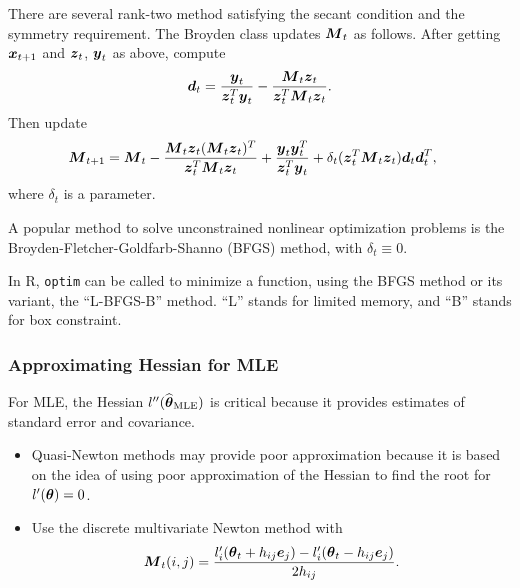   \begin{frame}
  There are several rank-two method satisfying the secant condition
  and the symmetry requirement.  The Broyden class updates $\boldsymbol{M}_t$
  as follows.  After getting $\boldsymbol{x}_{t+1}$ and $\boldsymbol{z}_t$, $\boldsymbol{y}_t$ as
  above, compute
  \begin{align*}
    \boldsymbol{d}_t = \frac{\boldsymbol{y}_t}{\boldsymbol{z}_t\sp{T}\boldsymbol{y}_t} -
    \frac{\boldsymbol{M}_t \boldsymbol{z}_t}{\boldsymbol{z}_t\sp{T} \boldsymbol{M}_t \boldsymbol{z}_t}.
  \end{align*}
  Then update
  \begin{align*}
    \boldsymbol{M}_{t+1}&=
    \boldsymbol{M}_t - \frac{\boldsymbol{M}_t \boldsymbol{z}_t(\boldsymbol{M}_t \boldsymbol{z}_t)\sp{T}}{\boldsymbol{z}_t\sp{T}\boldsymbol{M}_t \boldsymbol{z}_t} + \frac{\boldsymbol{y}_t \boldsymbol{y}_t\sp{T}}{\boldsymbol{z}_t\sp{T}\boldsymbol{y}_t}
    +
    \delta_t (\boldsymbol{z}_t\sp{T}\boldsymbol{M}_t\boldsymbol{z}_t)\boldsymbol{d}_t\boldsymbol{d}_t\sp{T},
  \end{align*}
  where $\delta_t$ is a parameter.

  A popular method to solve unconstrained nonlinear optimization
  problems is the Broyden-Fletcher-Goldfarb-Shanno (BFGS) method,
  with $\delta_t\equiv 0$.

  In R, \texttt{optim} can be called to minimize a function, using
  the BFGS method or its variant, the ``L-BFGS-B'' method. ``L'' stands for limited memory, and ``B'' stands for box constraint.

  \end{frame}

  \begin{frame}
  \frametitle{Approximating Hessian for MLE}
  For MLE, the Hessian $l''(\widehat{\boldsymbol{\theta}}_{\rm MLE})$ is critical
  because it provides estimates of standard error and covariance.
  \begin{itemize}
  \item Quasi-Newton methods may provide poor approximation because it
    is based on the idea of using poor approximation of the Hessian to
    find the root for $l'(\boldsymbol{\theta})=0$.
  \item Use the discrete multivariate Newton method with
    \begin{align*}
      \boldsymbol{M}_t(i,j) = \frac{l'_i(\boldsymbol{\theta}_t + h_{ij}\boldsymbol{e}_j) -
        l'_i(\boldsymbol{\theta}_t - h_{ij}\boldsymbol{e}_j)}{2h_{ij}}.
    \end{align*}
  \end{itemize}

  \end{frame}


